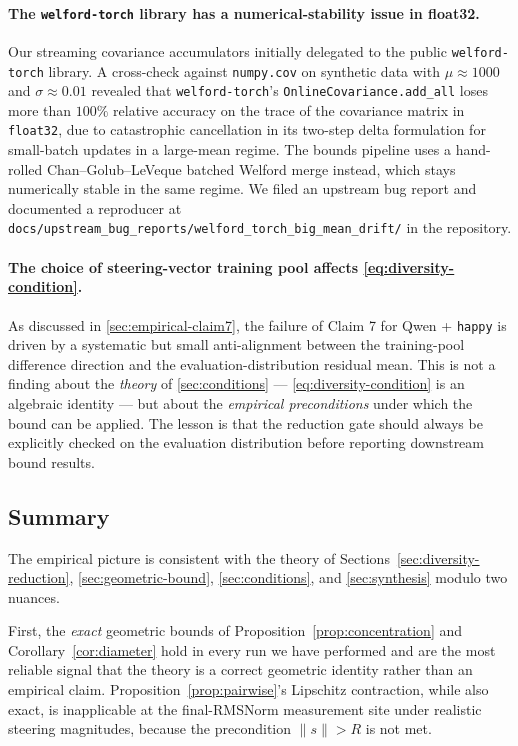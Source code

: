 \paragraph{The \texttt{welford-torch} library has a numerical-stability issue in float32.}
Our streaming covariance accumulators initially delegated to the public \texttt{welford-torch} library. A cross-check against \texttt{numpy.cov} on synthetic data with $\mu \approx 1000$ and $\sigma \approx 0.01$ revealed that \texttt{welford-torch}'s \texttt{OnlineCovariance.add\_all} loses more than $100\%$ relative accuracy on the trace of the covariance matrix in \texttt{float32}, due to catastrophic cancellation in its two-step delta formulation for small-batch updates in a large-mean regime. The bounds pipeline uses a hand-rolled Chan--Golub--LeVeque batched Welford merge instead, which stays numerically stable in the same regime. We filed an upstream bug report and documented a reproducer at \texttt{docs/upstream\_bug\_reports/welford\_torch\_big\_mean\_drift/} in the repository.

\paragraph{The choice of steering-vector training pool affects \ref{eq:diversity-condition}.}
As discussed in \ref{sec:empirical-claim7}, the failure of Claim 7 for Qwen + \texttt{happy} is driven by a systematic but small anti-alignment between the training-pool difference direction and the evaluation-distribution residual mean. This is not a finding about the \emph{theory} of \ref{sec:conditions} --- \ref{eq:diversity-condition} is an algebraic identity --- but about the \emph{empirical preconditions} under which the bound can be applied. The lesson is that the reduction gate should always be explicitly checked on the evaluation distribution before reporting downstream bound results.

\subsection{Summary}
\label{sec:empirical-summary}

The empirical picture is consistent with the theory of Sections~\ref{sec:diversity-reduction}, \ref{sec:geometric-bound}, \ref{sec:conditions}, and \ref{sec:synthesis} modulo two nuances.

First, the \emph{exact} geometric bounds of Proposition~\ref{prop:concentration} and Corollary~\ref{cor:diameter} hold in every run we have performed and are the most reliable signal that the theory is a correct geometric identity rather than an empirical claim. Proposition~\ref{prop:pairwise}'s Lipschitz contraction, while also exact, is inapplicable at the final-RMSNorm measurement site under realistic steering magnitudes, because the precondition $\|s\|>R$ is not met.

